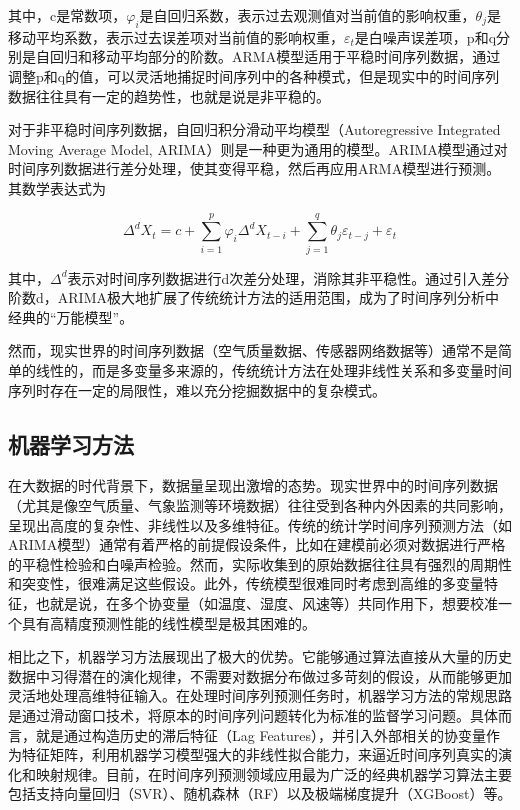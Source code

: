 \begin{enumerate}[label=（\arabic*）, leftmargin=0pt, itemindent=4.5em, labelsep=0.5em, listparindent=2em, parsep=0pt,]
    其中，c是常数项，$\varphi_i$是自回归系数，表示过去观测值对当前值的影响权重，$\theta_j$是移动平均系数，表示过去误差项对当前值的影响权重，$\varepsilon_t$是白噪声误差项，p和q分别是自回归和移动平均部分的阶数。ARMA模型适用于平稳时间序列数据，通过调整p和q的值，可以灵活地捕捉时间序列中的各种模式，但是现实中的时间序列数据往往具有一定的趋势性，也就是说是非平稳的。

    对于非平稳时间序列数据，自回归积分滑动平均模型（Autoregressive Integrated Moving Average Model, ARIMA）则是一种更为通用的模型。ARIMA模型通过对时间序列数据进行差分处理，使其变得平稳，然后再应用ARMA模型进行预测。其数学表达式为

    \begin{equation}
        \Delta^d X_t = c + \sum_{i=1}^{p} \varphi_i \Delta^d X_{t-i} + \sum_{j=1}^{q} \theta_j \varepsilon_{t-j} + \varepsilon_t
    \end{equation}

    其中，$\Delta^d$表示对时间序列数据进行d次差分处理，消除其非平稳性。通过引入差分阶数d，ARIMA极大地扩展了传统统计方法的适用范围，成为了时间序列分析中经典的“万能模型”。

    然而，现实世界的时间序列数据（空气质量数据、传感器网络数据等）通常不是简单的线性的，而是多变量多来源的，传统统计方法在处理非线性关系和多变量时间序列时存在一定的局限性，难以充分挖掘数据中的复杂模式。

\end{enumerate}


\subsection{机器学习方法}

在大数据的时代背景下，数据量呈现出激增的态势。现实世界中的时间序列数据（尤其是像空气质量、气象监测等环境数据）往往受到各种内外因素的共同影响，呈现出高度的复杂性、非线性以及多维特征。传统的统计学时间序列预测方法（如ARIMA模型）通常有着严格的前提假设条件，比如在建模前必须对数据进行严格的平稳性检验和白噪声检验。然而，实际收集到的原始数据往往具有强烈的周期性和突变性，很难满足这些假设。此外，传统模型很难同时考虑到高维的多变量特征，也就是说，在多个协变量（如温度、湿度、风速等）共同作用下，想要校准一个具有高精度预测性能的线性模型是极其困难的。

相比之下，机器学习方法展现出了极大的优势。它能够通过算法直接从大量的历史数据中习得潜在的演化规律，不需要对数据分布做过多苛刻的假设，从而能够更加灵活地处理高维特征输入。在处理时间序列预测任务时，机器学习方法的常规思路是通过滑动窗口技术，将原本的时间序列问题转化为标准的监督学习问题。具体而言，就是通过构造历史的滞后特征（Lag Features），并引入外部相关的协变量作为特征矩阵，利用机器学习模型强大的非线性拟合能力，来逼近时间序列真实的演化和映射规律。目前，在时间序列预测领域应用最为广泛的经典机器学习算法主要包括支持向量回归（SVR）、随机森林（RF）以及极端梯度提升（XGBoost）等。

